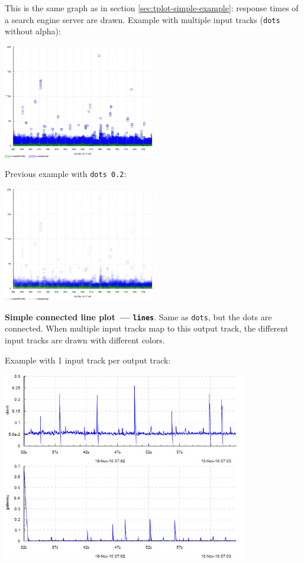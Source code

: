 \documentclass{article}
\begin{document}
This is the same graph as in section \ref{sec:tplot-simple-example}: response times of a search engine server are drawn.
Example with multiple input tracks (\texttt{dots} without alpha):

{\centering \includegraphics[width=0.5\textwidth]{pics/tplot/dots-create-user-and-profile.png}}

Previous example with \texttt{dots 0.2}:

{\centering \includegraphics[width=0.5\textwidth]{pics/tplot/dots-create-user-and-profile-alpha.png}}

\pagebreak
\noindent
\textbf{Simple connected line plot~--- \texttt{lines}}. Same as \texttt{dots}, but the dots are connected. When multiple input tracks map to this output track, the different input tracks are drawn with different colors.

Example with 1 input track per output track:

{\centering \includegraphics[width=0.8\textwidth]{pics/tplot/lines.png}}
\end{document}
